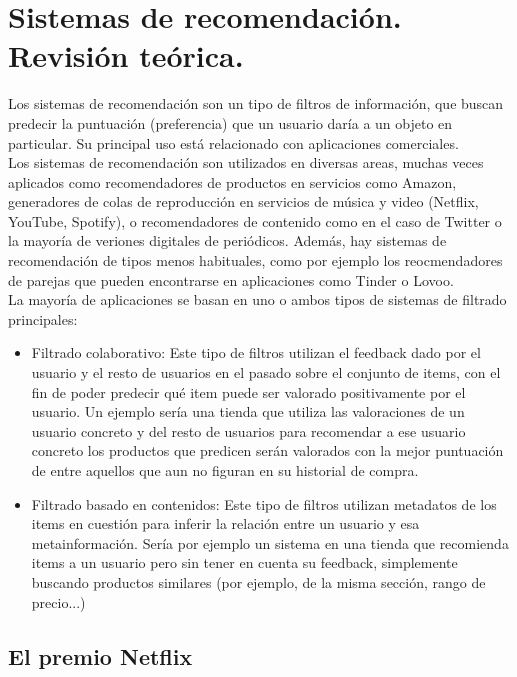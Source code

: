 \chapter{Sistemas de recomendación. Revisión teórica.}\label{chap:recom}

Los sistemas de recomendación son un tipo de filtros de información, que buscan predecir la puntuación (preferencia) que un usuario daría a un objeto en particular. Su principal uso está relacionado con aplicaciones comerciales.\\

Los sistemas de recomendación son utilizados en diversas areas, muchas veces aplicados como recomendadores de productos en servicios como Amazon, generadores de colas de reproducción en servicios de música y video (Netflix, YouTube, Spotify), o recomendadores de contenido como en el caso de Twitter o la mayoría de veriones digitales de periódicos. Además, hay sistemas de recomendación de tipos menos habituales, como por ejemplo los reocmendadores de parejas que pueden encontrarse en aplicaciones como Tinder o Lovoo.\\

La mayoría de aplicaciones se basan en uno o ambos tipos de sistemas de filtrado principales:

\begin{itemize}
    \item Filtrado colaborativo: Este tipo de filtros utilizan el feedback dado por el usuario y el resto de usuarios en el pasado sobre el conjunto de items, con el fin de poder predecir qué item puede ser valorado positivamente por el usuario. Un ejemplo sería una tienda que utiliza las valoraciones de un usuario concreto y del resto de usuarios para recomendar a ese usuario concreto los productos que predicen serán valorados con la mejor puntuación de entre aquellos que aun no figuran en su historial de compra.
    \item Filtrado basado en contenidos: Este tipo de filtros utilizan metadatos de los items en cuestión para inferir la relación entre un usuario y esa metainformación. Sería por ejemplo un sistema en una tienda que recomienda items a un usuario pero sin tener en cuenta su feedback, simplemente buscando productos similares (por ejemplo, de la misma sección, rango de precio...)
\end{itemize}

\section{El premio Netflix}

